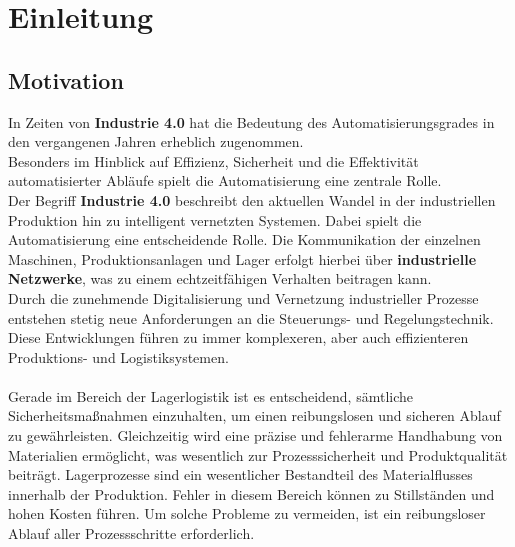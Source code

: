 
\section{Einleitung}
\label{cha: Einleitung}
\subsection{Motivation}
In Zeiten von \textbf{Industrie 4.0} hat die Bedeutung des Automatisierungsgrades in den vergangenen Jahren erheblich zugenommen.\\
Besonders im Hinblick auf Effizienz, Sicherheit und die Effektivität automatisierter Abläufe spielt die Automatisierung eine zentrale Rolle.\\
Der Begriff \textbf{Industrie 4.0} beschreibt den aktuellen Wandel in der industriellen Produktion hin zu intelligent vernetzten Systemen. Dabei spielt die Automatisierung eine entscheidende Rolle. Die Kommunikation der einzelnen Maschinen, Produktionsanlagen und Lager erfolgt hierbei über \textbf{industrielle Netzwerke}, was zu einem echtzeitfähigen Verhalten beitragen kann.\\
Durch die zunehmende Digitalisierung und Vernetzung industrieller Prozesse entstehen stetig neue Anforderungen an die Steuerungs- und Regelungstechnik. Diese Entwicklungen führen zu immer komplexeren, aber auch effizienteren Produktions- und Logistiksystemen.\\\\
Gerade im Bereich der Lagerlogistik ist es entscheidend, sämtliche Sicherheitsmaßnahmen einzuhalten, um einen reibungslosen und sicheren Ablauf zu gewährleisten. Gleichzeitig wird eine präzise und fehlerarme Handhabung von Materialien ermöglicht, was wesentlich zur Prozesssicherheit und Produktqualität beiträgt. Lagerprozesse sind ein wesentlicher Bestandteil des Materialflusses innerhalb der Produktion. Fehler in diesem Bereich können zu Stillständen und hohen Kosten führen. Um solche Probleme zu vermeiden, ist ein reibungsloser Ablauf aller Prozessschritte erforderlich.
